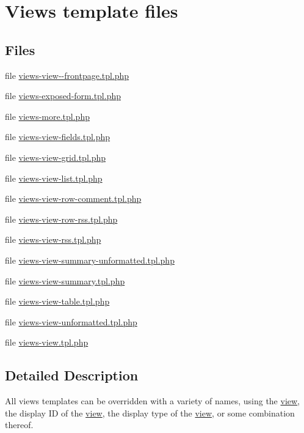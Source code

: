 \hypertarget{group__views__templates}{
\section{Views template files}
\label{group__views__templates}
}
\subsection*{Files}
\begin{DoxyCompactItemize}
\item 
file \hyperlink{views-view--frontpage_8tpl_8php}{views-\/view-\/-\/frontpage.tpl.php}
\item 
file \hyperlink{views-exposed-form_8tpl_8php}{views-\/exposed-\/form.tpl.php}
\item 
file \hyperlink{views-more_8tpl_8php}{views-\/more.tpl.php}
\item 
file \hyperlink{views-view-fields_8tpl_8php}{views-\/view-\/fields.tpl.php}
\item 
file \hyperlink{views-view-grid_8tpl_8php}{views-\/view-\/grid.tpl.php}
\item 
file \hyperlink{views-view-list_8tpl_8php}{views-\/view-\/list.tpl.php}
\item 
file \hyperlink{views-view-row-comment_8tpl_8php}{views-\/view-\/row-\/comment.tpl.php}
\item 
file \hyperlink{views-view-row-rss_8tpl_8php}{views-\/view-\/row-\/rss.tpl.php}
\item 
file \hyperlink{views-view-rss_8tpl_8php}{views-\/view-\/rss.tpl.php}
\item 
file \hyperlink{views-view-summary-unformatted_8tpl_8php}{views-\/view-\/summary-\/unformatted.tpl.php}
\item 
file \hyperlink{views-view-summary_8tpl_8php}{views-\/view-\/summary.tpl.php}
\item 
file \hyperlink{views-view-table_8tpl_8php}{views-\/view-\/table.tpl.php}
\item 
file \hyperlink{views-view-unformatted_8tpl_8php}{views-\/view-\/unformatted.tpl.php}
\item 
file \hyperlink{views-view_8tpl_8php}{views-\/view.tpl.php}
\end{DoxyCompactItemize}


\subsection{Detailed Description}
All views templates can be overridden with a variety of names, using the \hyperlink{classview}{view}, the display ID of the \hyperlink{classview}{view}, the display type of the \hyperlink{classview}{view}, or some combination thereof.

